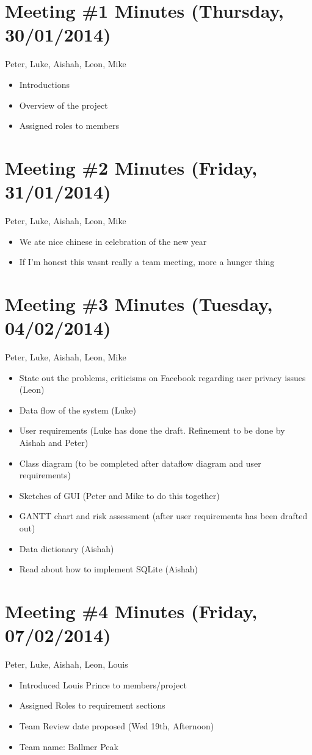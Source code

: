 \section{Meeting \#1 Minutes (Thursday, 30/01/2014)}
Peter, Luke, Aishah, Leon, Mike
\begin{itemize}
\item Introductions
\item Overview of the project
\item Assigned roles to members
\end{itemize}

\section{Meeting \#2 Minutes (Friday, 31/01/2014)}
Peter, Luke, Aishah, Leon, Mike
\begin{itemize}
\item We ate nice chinese in celebration of the new year
\item If I'm honest this wasnt really a team meeting, more a hunger thing
\end{itemize}

\section{Meeting \#3 Minutes (Tuesday, 04/02/2014)}
Peter, Luke, Aishah, Leon, Mike
\begin{itemize}
\item State out the problems, criticisms on Facebook regarding user privacy issues
    (Leon)
\item Data flow of the system (Luke)
\item User requirements (Luke has done the draft. Refinement to be done by Aishah
    and Peter)
\item Class diagram (to be completed after dataflow diagram and user requirements)
\item Sketches of GUI (Peter and Mike to do this together)
\item GANTT chart and risk assessment (after user requirements has been drafted out)
\item Data dictionary (Aishah)
\item Read about how to implement SQLite (Aishah)
\end{itemize}

\section{Meeting \#4 Minutes (Friday, 07/02/2014)}
Peter, Luke, Aishah, Leon, Louis
\begin{itemize}
\item Introduced Louis Prince to members/project
\item Assigned Roles to requirement sections
\item Team Review date proposed (Wed 19th, Afternoon)
\item Team name: Ballmer Peak
\end{itemize}

